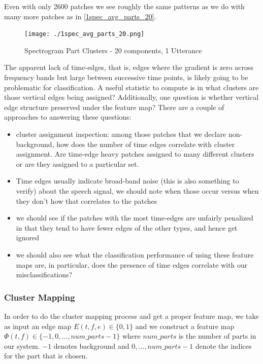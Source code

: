 \documentclass[11pt]{article}
\begin{document}
Even with only 2600 patches we see roughly the same patterns as we do
with many more patches as in \ref{1spec_avg_parts_20}.

\begin{figure}[htb]
\centering
\texttt{[image: ./1spec\_avg\_parts\_20.png]}
\caption{\label{fig:1spec_avg_parts_20}Spectrogram Part Clusters - 20 components, 1 Utterance}
\end{figure}

The apparent lack of time-edges, that is, edges where the gradient is
zero across frequency bands but large between successive time points,
is likely going to be problematic for classification.  A useful
statistic to compute is in what clusters are those vertical edges
being assigned?  Additionally, one question is whether vertical edge
structure preserved under the feature map?  There are a couple of
approaches to answering these questions:
\begin{itemize}
\item cluster assignment inspection: among those patches that we declare
  non-background, how does the number of time edges correlate with cluster
  assignment.  Are time-edge heavy patches assigned to many different clusters
  or are they assigned to a particular set.
\item Time edges usually indicate broad-band noise (this is also something to verify)
  about the speech signal, we should note when those occur versus when they don't
  how that correlates to the patches
\item we should see if the patches with the most time-edges are unfairly penalized
  in that they tend to have fewer edges of the other types, and hence get ignored
\item we should also see what the classification performance of using these feature maps
  are, in particular, does the presence of time edges correlate with our
  misclassifications?
\end{itemize}
\subsubsection{Cluster Mapping}
\label{sec-2-2-1}


In order to do the cluster mapping process and get a proper feature
map, we take as input an edge map $E(t,f,e)\in \{0,1\}$ and we construct
a feature map $\Phi(t,f)\in \{-1,0,\ldots,num\_parts-1\}$ where
$num\_parts$ is the number of parts in our system.  $-1$ denotes background
and $0,\dots,num\_parts-1$ denote the indices for the part that is chosen.
\end{document}
